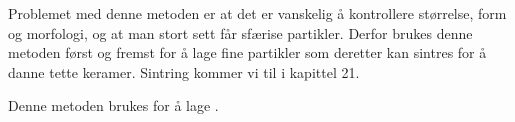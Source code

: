 Problemet med denne metoden er at det er vanskelig å kontrollere størrelse, form og morfologi, og at man stort sett får sfærise partikler. Derfor brukes denne metoden først og fremst for å lage fine partikler som deretter kan sintres for å danne tette keramer. Sintring kommer vi til i kapittel 21.

Denne metoden brukes for å lage .
